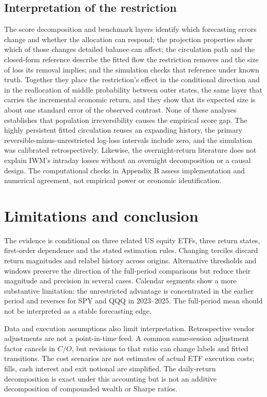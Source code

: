 \subsection{Interpretation of the restriction}
The score decomposition and benchmark layers identify which forecasting errors change and whether the allocation can respond; the projection properties show which of those changes detailed balance can affect; the circulation path and the closed-form reference describe the fitted flow the restriction removes and the size of loss its removal implies; and the simulation checks that reference under known truth. Together they place the restriction's effect in the conditional direction and in the reallocation of middle probability between outer states, the same layer that carries the incremental economic return, and they show that its expected size is about one standard error of the observed contrast. None of these analyses establishes that population irreversibility causes the empirical score gap. The highly persistent fitted circulation reuses an expanding history, the primary reversible-minus-unrestricted log-loss intervals include zero, and the simulation was calibrated retrospectively. Likewise, the overnight-return literature does not explain IWM's intraday losses without an overnight decomposition or a causal design. The computational checks in Appendix B assess implementation and numerical agreement, not empirical power or economic identification.

\section{Limitations and conclusion}
The evidence is conditional on three related US equity ETFs, three return states, first-order dependence and the stated estimation rules. Changing terciles discard return magnitudes and relabel history across origins. Alternative thresholds and windows preserve the direction of the full-period comparisons but reduce their magnitude and precision in several cases. Calendar segments show a more substantive limitation: the unrestricted advantage is concentrated in the earlier period and reverses for SPY and QQQ in 2023--2025. The full-period mean should not be interpreted as a stable forecasting edge.

Data and execution assumptions also limit interpretation. Retrospective vendor adjustments are not a point-in-time feed. A common same-session adjustment factor cancels in $C/O$, but revisions to that ratio can change labels and fitted transitions. The cost scenarios are not estimates of actual ETF execution costs; fills, cash interest and exit notional are simplified. The daily-return decomposition is exact under this accounting but is not an additive decomposition of compounded wealth or Sharpe ratios.


